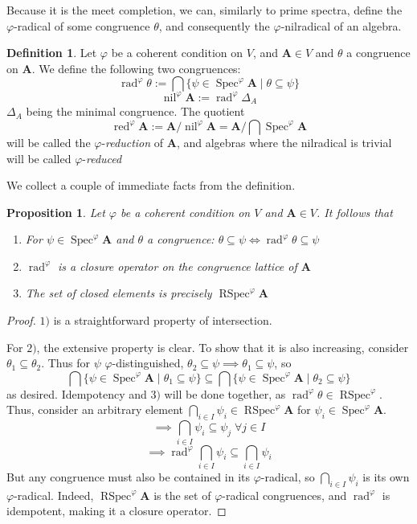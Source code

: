 \documentclass{article}
\theoremstyle{plain}
\newtheorem{proposition}[theorem]{Proposition}
\theoremstyle{definition}
\newtheorem{definition}{Definition}[section]
\newcommand{\Spec}{\operatorname{Spec}}
\newcommand{\RSpec}{\operatorname{RSpec}}
\newcommand{\nil}{\operatorname{nil}}
\newcommand{\rad}{\operatorname{rad}}
\begin{document}
Because it is the meet completion, we can, similarly to prime spectra, define the $\varphi$-radical of some congruence $\theta$, and consequently the $\varphi$-nilradical of an algebra.

\begin{definition}
    Let $\varphi$ be a coherent condition on $V$, and $\mathbf{A} \in V$ and $\theta$ a congruence on $\mathbf{A}$.
    We define the following two congruences:
    $$\rad^\varphi\theta := \bigcap \{ \psi \in \Spec^\varphi\mathbf{A} \mid \theta \subseteq \psi\}$$
    $$\nil^\varphi\mathbf{A} := \rad^\varphi\Delta_A$$
    $\Delta_A$ being the minimal congruence.
    The quotient 
    $$\operatorname{red}^\varphi\mathbf{A} := \mathbf{A} / \nil^\varphi\mathbf{A} = \mathbf{A} / \bigcap\Spec^\varphi\mathbf{A}$$
    will be called the $\varphi$-\textit{reduction} of $\mathbf{A}$, and algebras where the nilradical is trivial will be called $\varphi$-\textit{reduced}
\end{definition}

We collect a couple of immediate facts from the definition.

\begin{proposition} \label{prop:radfacts}
    Let $\varphi$ be a coherent condition on $V$ and $\mathbf{A} \in V$.
    It follows that
    \begin{enumerate}
        \item For $\psi\in \Spec^\varphi\mathbf{A}$ and $\theta$ a congruence: $\theta \subseteq \psi \iff \rad^\varphi\theta \subseteq \psi$
        \item $\rad^\varphi$ is a closure operator on the congruence lattice of $\mathbf{A}$
        \item The set of closed elements is precisely $\RSpec^\varphi\mathbf{A}$
    \end{enumerate}
\end{proposition}
\begin{proof}
    $1)$ is a straightforward property of intersection.\par
    For $2)$, the extensive property is clear.
    To show that it is also increasing, consider $\theta_1 \subseteq \theta_2$.
    Thus for $\psi$ $\varphi$-distinguished, $\theta_2\subseteq \psi \implies \theta_1\subseteq \psi$, so
    $$\bigcap \{ \psi \in \Spec^\varphi\mathbf{A} \mid \theta_1 \subseteq \psi \} \subseteq \bigcap \{ \psi \in \Spec^\varphi\mathbf{A} \mid \theta_2 \subseteq \psi \}$$
    as desired.
    Idempotency and $3)$ will be done together, as $\rad^\varphi\theta \in \RSpec^\varphi$.
    Thus, consider an arbitrary element $\bigcap_{i \in I}\psi_i \in \RSpec^\varphi\mathbf{A}$ for $\psi_i \in \Spec^\varphi\mathbf{A}$.
    $$\implies \bigcap_{i \in I} \psi_i \subseteq \psi_j \; \forall j \in I$$
    $$\implies \rad^\varphi \bigcap_{i \in I} \psi_i \subseteq \bigcap_{i \in I} \psi_i$$
    But any congruence must also be contained in its $\varphi$-radical, so $\bigcap_{i \in I} \psi_i$ is its own $\varphi$-radical.
    Indeed, $\RSpec^\varphi\mathbf{A}$ is the set of $\varphi$-radical congruences, and $\rad^\varphi$ is idempotent, making it a closure operator.
\end{proof}
\end{document}

